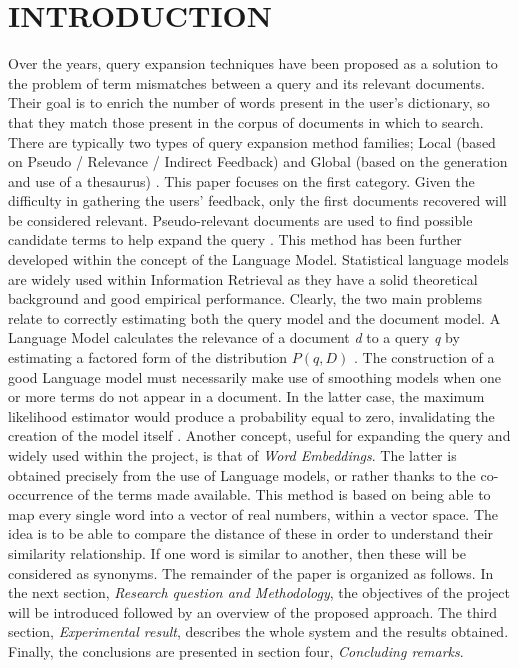 \section*{INTRODUCTION}
Over the years, query expansion techniques have been proposed as a solution 
to the problem of term mismatches between a query and its relevant 
documents. Their goal is to enrich the number of words present in the user's 
dictionary, so that they match those present in the corpus of documents in 
which to search. There are typically two types of query expansion method 
families; Local (based on Pseudo / Relevance / Indirect Feedback) and Global 
(based on the generation and use of a thesaurus) \cite{01}. This paper focuses on 
the first category. Given the difficulty in gathering the users' feedback, only 
the first documents recovered will be considered relevant. Pseudo-relevant 
documents are used to find possible candidate terms to help expand the 
query \cite{02}. This method has been further developed within the concept of 
the Language Model\cite{06}. Statistical language models are widely used within 
Information Retrieval as they have a solid theoretical background and good 
empirical performance. Clearly, the two main problems relate to correctly 
estimating both the query model and the document model. A Language 
Model calculates the relevance of a document \emph{d} to a query \emph{q} by estimating 
a factored form of the distribution $P (q, D)$ \cite{03}. The construction of a good 
Language model must necessarily make use of smoothing models when one 
or more terms do not appear in a document. In the latter case, the maximum 
likelihood estimator would produce a probability equal to zero, invalidating 
the creation of the model itself \cite{04}\cite{05}. Another concept, useful for expanding 
the query and widely used within the project, is that of \emph{Word Embeddings}. 
The latter is obtained precisely from the use of Language models, or rather 
thanks to the co-occurrence of the terms made available. This method is 
based on being able to map every single word into a vector of real numbers, 
within a vector space. The idea is to be able to compare the distance of these 
in order to understand their similarity relationship. If one word is similar to 
another, then these will be considered as synonyms. The remainder of 
the paper is organized as follows. In the next section, \emph{Research question and 
Methodology}, the objectives of the project will be introduced followed by an 
overview of the proposed approach. The third section, \emph{Experimental result}, 
describes the whole system and the results obtained. Finally, the conclusions 
are presented in section four, \emph{Concluding remarks}.